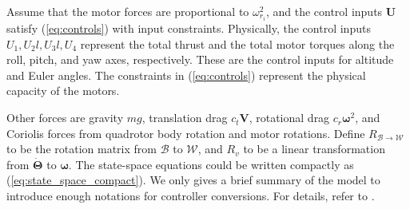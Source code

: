 \documentclass[journal,11pt,onecolumn,draftclsnofoot,]{IEEEtran}
\begin{document}
Assume that the motor forces are proportional to $\omega _{r_i}^2$, and the control inputs $\boldsymbol{U}$ satisfy (\ref{eq:controls}) with input constraints. Physically, the control inputs $U_1, U_2l, U_3l, U_4$ represent the total thrust and the total motor torques along the roll, pitch, and yaw axes, respectively. These are the control inputs for altitude and Euler angles. The constraints in (\ref{eq:controls}) represent the physical capacity of the motors.

Other forces are gravity $mg$, translation drag $c_t \boldsymbol{V}$, rotational drag $c_r \boldsymbol{\omega}^2$, and Coriolis forces from quadrotor body rotation and motor rotations. Define $R_{\mathcal{B}\rightarrow \mathcal{W}}$ to be the rotation matrix from $\mathcal{B}$ to $\mathcal{W}$, and $R_v$ to be a linear transformation from $\boldsymbol{\dot{\Theta}}$ to $\boldsymbol{\omega}$. The state-space equations could be written compactly as (\ref{eq:state_space_compact}). We only gives a brief summary of the model to introduce enough notations for controller conversions. For details, refer to \cite{bouadi2011adaptive}.
\end{document}

